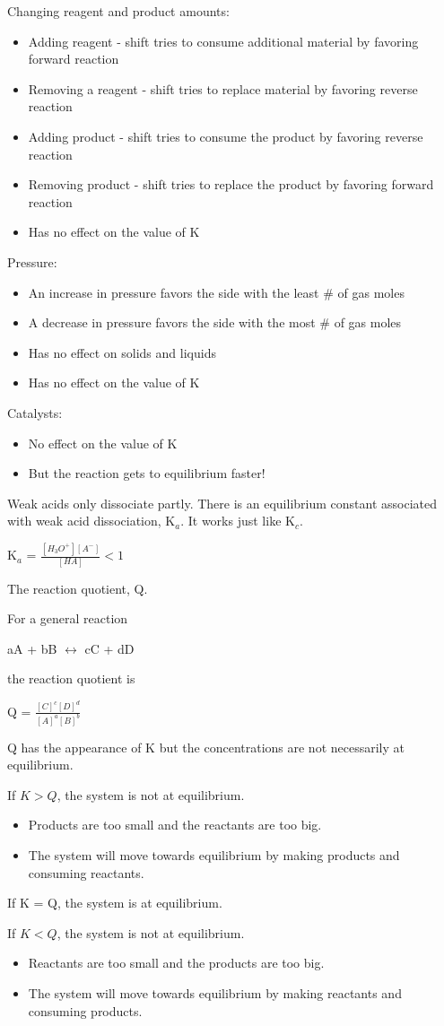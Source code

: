 \documentclass[../hchem.tex]{subfiles}
\begin{document}
Changing reagent and product amounts:
\begin{itemize}
    \item Adding reagent - shift tries to consume additional material by favoring forward reaction 
    \item Removing a reagent - shift tries to replace material by favoring reverse reaction 
    \item Adding product - shift tries to consume the product by favoring reverse reaction 
    \item Removing product - shift tries to replace the product by favoring forward reaction 
    \item Has no effect on the value of K 
\end{itemize}

Pressure:
\begin{itemize}
    \item An increase in pressure favors the side with the least \# of gas moles 
    \item A decrease in pressure favors the side with the most \# of gas moles 
    \item Has no effect on solids and liquids 
    \item Has no effect on the value of K
\end{itemize}

Catalysts:
\begin{itemize}
    \item No effect on the value of K 
    \item But the reaction gets to equilibrium faster!
\end{itemize}

Weak acids only dissociate partly. There is an equilibrium constant associated with weak acid dissociation, K$_a$. It works just like K$_c$.
\begin{center}
    K$_a$ = $\frac{[H_3O^+][A^-]}{[HA]}<1$
\end{center}

The reaction quotient, Q.

For a general reaction 
\begin{center}
    aA + bB $\leftrightarrow$ cC + dD 
\end{center}
the reaction quotient is 
\begin{center}
    Q = $\frac{[C]^c[D]^d}{[A]^a[B]^b}$
\end{center}
Q has the appearance of K but the concentrations are not necessarily at equilibrium.

If $K>Q$, the system is not at equilibrium.
\begin{itemize}
    \item Products are too small and the reactants are too big.
    \item The system will move towards equilibrium by making products and consuming reactants.
\end{itemize}

If K = Q, the system is at equilibrium.

If $K<Q$, the system is not at equilibrium.
\begin{itemize}
    \item Reactants are too small and the products are too big.
    \item The system will move towards equilibrium by making reactants and consuming products.
\end{itemize}
\end{document}
